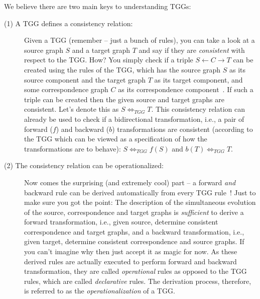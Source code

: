 We believe there are two main keys to understanding TGGs:
\begin{description}
\item[(1) A TGG defines a consistency relation:]
	Given a TGG (remember -- just a bunch of rules), you can take a look at a source graph $S$ and a target graph $T$ and say if they are \emph{consistent} with respect to the TGG.
	How?  You simply check if a triple $S\leftarrow C\rightarrow T$ can be created using the rules of the TGG, which has the source graph $S$ as its source component and the target graph $T$ as its target component, and some correspondence graph $C$ as its correspondence component~\cite{Hermann2011a}.
	If such a triple can be created then the given source and target graphs are consistent.
	Let's denote this as $S \Leftrightarrow_{TGG} T$.
	This consistency relation can already be used to check if a bidirectional transformation, i.e., a pair of forward ($f$) and backward ($b$) transformations are consistent (according to the TGG which can be viewed as a specification of how the transformations are to behave):  $S \Leftrightarrow_{TGG} f(S)$ and $b(T) \Leftrightarrow_{TGG} T$.
	
\item[(2) The consistency relation can be operationalized:]
Now comes the surprising (and extremely cool) part -- a forward \emph{and} backward rule can be derived automatically from every TGG rule~\cite{Giese2010,Hermann2011a}!
Just to make sure you got the point:  The description of the simultaneous evolution of the source, correspondence and target graphs is \emph{sufficient} to derive a forward transformation, i.e., given source, determine consistent correspondence and target graphs, and a backward transformation, i.e., given target, determine consistent correspondence and source graphs.
If you can't imagine why then just accept it as magic for now.
As these derived rules are actually executed to perform forward and backward transformation, they are called \emph{operational} rules as opposed to the TGG rules, which are called \emph{declarative} rules.
The derivation process, therefore, is referred to as the \emph{operationalization} of a TGG. 
\end{description}

